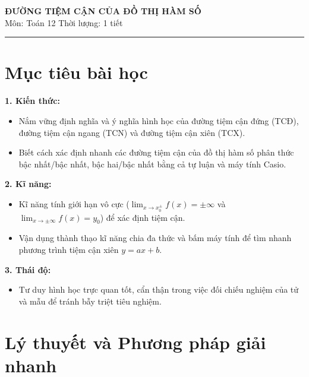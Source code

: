 \documentclass[12pt]{article}
\begin{document}
	
	\begin{center}
		{\LARGE \textbf{ĐƯỜNG TIỆM CẬN CỦA ĐỒ THỊ HÀM SỐ}}\\[6pt]
		{\large Môn: Toán 12 \quad Thời lượng: 1 tiết}
	\end{center}
	\vspace{4mm}
	\hrule
	\vspace{4mm}
	
	\section*{Mục tiêu bài học}
	
	\textbf{1. Kiến thức:}
	\begin{itemize}
		\item Nắm vững định nghĩa và ý nghĩa hình học của đường tiệm cận đứng (TCĐ), đường tiệm cận ngang (TCN) và đường tiệm cận xiên (TCX).
		\item Biết cách xác định nhanh các đường tiệm cận của đồ thị hàm số phân thức bậc nhất/bậc nhất, bậc hai/bậc nhất bằng cả tự luận và máy tính Casio.
	\end{itemize}
	
	\textbf{2. Kĩ năng:}
	\begin{itemize}
		\item Kĩ năng tính giới hạn vô cực ($\lim_{x \to x_0^{\pm}} f(x) = \pm\infty$ và $\lim_{x \to \pm\infty} f(x) = y_0$) để xác định tiệm cận.
		\item Vận dụng thành thạo kĩ năng chia đa thức và bấm máy tính để tìm nhanh phương trình tiệm cận xiên $y = ax + b$.
	\end{itemize}
	
	\textbf{3. Thái độ:}
	\begin{itemize}
		\item Tư duy hình học trực quan tốt, cẩn thận trong việc đối chiếu nghiệm của tử và mẫu để tránh bẫy triệt tiêu nghiệm.
	\end{itemize}
	
	\newpage
	
	\setcounter{tocdepth}{2}
	\tableofcontents
	\newpage
	
	\section{Lý thuyết và Phương pháp giải nhanh}
	
\end{document}
